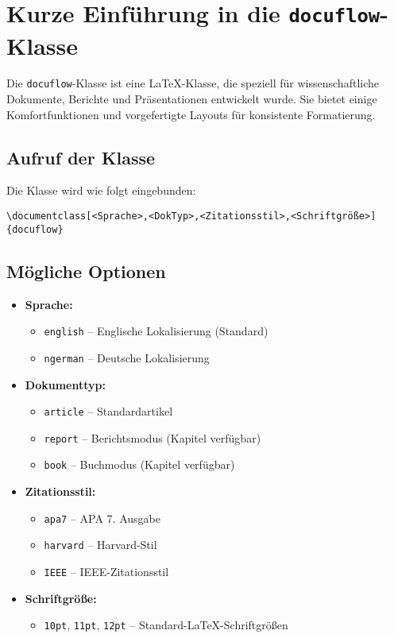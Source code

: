 
\section{Kurze Einführung in die \texttt{docuflow}-Klasse}

Die \texttt{docuflow}-Klasse ist eine LaTeX-Klasse, die speziell für wissenschaftliche Dokumente, Berichte und Präsentationen entwickelt wurde. 
Sie bietet einige Komfortfunktionen und vorgefertigte Layouts für konsistente Formatierung.

\subsection{Aufruf der Klasse}

Die Klasse wird wie folgt eingebunden:

\begin{verbatim}
\documentclass[<Sprache>,<DokTyp>,<Zitationsstil>,<Schriftgröße>]{docuflow}
\end{verbatim}

\subsection{Mögliche Optionen}

\begin{itemize}
    \item \textbf{Sprache:} 
    \begin{itemize}
        \item \texttt{english} – Englische Lokalisierung (Standard)
        \item \texttt{ngerman} – Deutsche Lokalisierung
    \end{itemize}
    \item \textbf{Dokumenttyp:} 
    \begin{itemize}
        \item \texttt{article} – Standardartikel
        \item \texttt{report} – Berichtsmodus (Kapitel verfügbar)
        \item \texttt{book} – Buchmodus (Kapitel verfügbar)
    \end{itemize}
    \item \textbf{Zitationsstil:} 
    \begin{itemize}
        \item \texttt{apa7} – APA 7. Ausgabe
        \item \texttt{harvard} – Harvard-Stil
        \item \texttt{IEEE} – IEEE-Zitationsstil
    \end{itemize}
    \item \textbf{Schriftgröße:} 
    \begin{itemize}
        \item \texttt{10pt}, \texttt{11pt}, \texttt{12pt} – Standard-LaTeX-Schriftgrößen
    \end{itemize}
\end{itemize}

